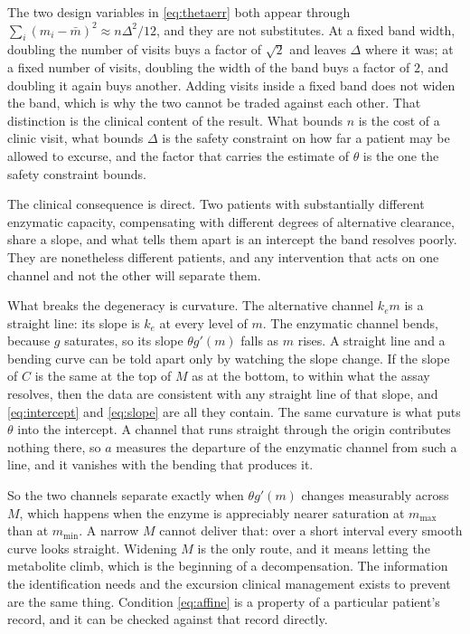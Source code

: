 The two design variables in \eqref{eq:thetaerr} both appear through
$\sum_i (m_i - \bar m)^2 \approx n\Delta^2/12$, and they are not substitutes. At a fixed
band width, doubling the number of visits buys a factor of $\sqrt2$ and leaves $\Delta$
where it was; at a fixed number of visits, doubling the width of the band buys a factor of
$2$, and doubling it again buys another. Adding visits inside a fixed band does not widen
the band, which is why the two cannot be traded against each other. That distinction is the
clinical content of the result. What bounds $n$ is the cost of a clinic visit, what bounds
$\Delta$ is the safety constraint on how far a patient may be allowed to excurse, and the
factor that carries the estimate of $\theta$ is the one the safety constraint bounds.

The clinical consequence is direct. Two patients with substantially different enzymatic
capacity, compensating with different degrees of alternative clearance, share a slope, and
what tells them apart is an intercept the band resolves poorly. They are nonetheless
different patients, and any intervention that acts on one channel and not the other will
separate them.

What breaks the degeneracy is curvature. The alternative
channel $k_e m$ is a straight line: its slope is $k_e$ at every level of $m$. The enzymatic
channel bends, because $g$ saturates, so its slope $\theta g'(m)$ falls as $m$ rises. A
straight line and a bending curve can be told apart only by watching the slope change. If
the slope of $C$ is the same at the top of $M$ as at the bottom, to within what the assay
resolves, then the data are consistent with any straight line of that slope, and
\eqref{eq:intercept} and \eqref{eq:slope} are all they contain. The same curvature is what
puts $\theta$ into the intercept. A channel that runs straight through the origin
contributes nothing there, so $a$ measures the departure of the enzymatic channel from such
a line, and it vanishes with the bending that produces it.

So the two channels separate exactly when $\theta g'(m)$ changes measurably across $M$,
which happens when the enzyme is appreciably nearer saturation at $m_{\max}$ than at
$m_{\min}$. A narrow $M$ cannot deliver that: over a short interval every smooth curve looks
straight. Widening $M$ is the only route, and it means letting the metabolite climb, which
is the beginning of a decompensation. The information the identification needs and the excursion clinical
management exists to prevent are the same thing. Condition \eqref{eq:affine} is a
property of a particular patient's record, and it can be checked against that record
directly.

